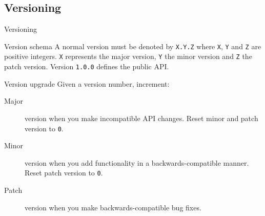 \subsection{Versioning}
\begin{frame}{Versioning}
    \begin{block}{Version schema}
        A normal version must be denoted by \texttt{X.Y.Z} where \texttt{X}, \texttt{Y} and \texttt{Z} are positive integers. \texttt{X} represents the major version, \texttt{Y} the minor version and \texttt{Z} the patch version. Version \texttt{1.0.0} defines the public API.
    \end{block}
    \pause
    \begin{block}{Version upgrade}
        Given a version number, increment:
        \begin{description}
            \item[Major] version when you make incompatible API changes. Reset minor and patch version to \texttt{0}.
            \item[Minor] version when you add functionality in a backwards-compatible manner. Reset patch version to \texttt{0}.
            \item[Patch] version when you make backwards-compatible bug fixes.
        \end{description}
    \end{block}
\end{frame}

